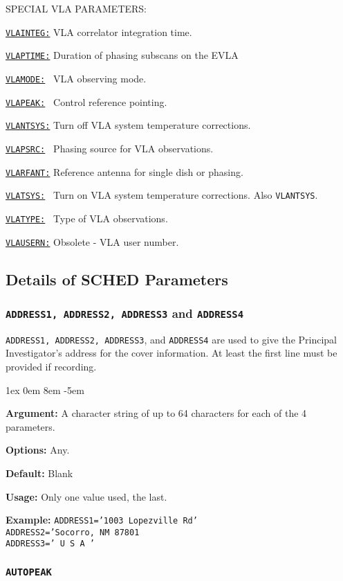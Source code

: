 \documentclass{report}
\newcommand{\rcwbox}[5]{
  \begin{list}{}{\parsep 1ex  \itemsep 0em
                 \leftmargin 8em  \itemindent -5em }
    \item {\bf Argument:} #1
    \item {\bf Options:}  #2
    \item {\bf Default:}  #3
    \item {\bf Usage:}    #4
    \item {\bf Example:}  #5
  \end{list}
}
\newcommand{\htlm}[2]%
{\item
  \hyperref[MP:#1]{{\tt #1:}}{\tt #2}%
}
\newcommand{\htln}[3]%
{\item
  \hyperref[MP:#2]{{\tt #1:}}{\tt #3}%
}
\newcommand{\htls}[2]%
{\item
  \hyperref[SP:#1]{{\tt #1:}}{\tt #2}%
}
\begin{document}
SPECIAL VLA PARAMETERS:

\begin{list}{}{\parsep 0em  \itemsep 0em }
\htlm{VLAINTEG}{} VLA correlator integration time.
\htlm{VLAPTIME}{} Duration of phasing subscans on the EVLA
\htlm{VLAMODE}{~} VLA observing mode.
\htlm{VLAPEAK}{~} Control reference pointing.
\htln{VLANTSYS}{VLATSYS}{} Turn off VLA system temperature corrections.
\htlm{VLAPSRC}{~} Phasing source for VLA observations.
\htlm{VLARFANT}{} Reference antenna for single dish or phasing.
\htlm{VLATSYS}{~} Turn on VLA system temperature corrections. Also {\tt VLANTSYS}.
\htlm{VLATYPE}{~} Type of VLA observations.
\htlm{VLAUSERN}{} Obsolete - VLA user number.
\end{list}


\subsection{\label{SSEC:PARDET}Details of SCHED Parameters}


\subsubsection{\label{MP:ADDRESS1}
{\tt ADDRESS1, ADDRESS2, ADDRESS3} and {\tt ADDRESS4}}

{\tt ADDRESS1, ADDRESS2, ADDRESS3}, and {\tt ADDRESS4} are used to
give the Principal Investigator's address for the cover information.
At least the first line must be provided if recording.

\rcwbox
{A character string of up to 64 characters for each of the 4
parameters.}
{Any.}
{Blank}
{Only one value used, the last.}
{{\tt ADDRESS1='1003 Lopezville Rd'}\\
{\tt ADDRESS2='Socorro, NM 87801}\\
{\tt ADDRESS3='  U S A '}}

\subsubsection{\label{MP:AUTOPEAK}{\tt AUTOPEAK}}
\end{document}
